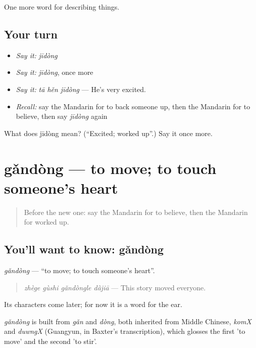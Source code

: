 \begin{grammarlens}[title={What you've built}]
One more word for describing things.
\end{grammarlens}

\subsection*{Your turn}
\begin{itemize}
\raggedright
  \item \emph{Say it:} \emph{jīdòng}
  \item \emph{Say it:} \emph{jīdòng}, once more
  \item \emph{Say it:} \emph{tā hěn jīdòng} — He's very excited.
  \item \emph{Recall:} say the Mandarin for to back someone up, then the Mandarin for to believe, then say \emph{jīdòng} again
\end{itemize}

\begin{tcolorbox}[breakable,colback=teal!4,colframe=teal!35!black,title={Before you move on}]
What does jīdòng mean? (\textquotedblleft{}Excited; worked up\textquotedblright{}.) Say it once more.
\end{tcolorbox}
\section[gǎndòng]{gǎndòng — to move; to touch someone's heart}

\label{lesson:ZH-C271-gandong}



\begin{quote}
Before the new one: say the Mandarin for to believe, then the Mandarin for worked up.
\end{quote}

\subsection*{You'll want to know: gǎndòng}
\emph{gǎndòng} — \textquotedblleft{}to move; to touch someone's heart\textquotedblright{}.

\begin{quote}
\emph{zhège gùshi gǎndòngle dàjiā} — This story moved everyone.
\end{quote}

Its characters come later; for now it is a word for the ear.

\begin{cousinweb}
\emph{gǎndòng} is built from \emph{gǎn} and \emph{dòng}, both inherited from Middle Chinese, \emph{komX} and \emph{duwngX} (Guangyun, in Baxter's transcription), which glosses the first 'to move' and the second 'to stir'.
\end{cousinweb}


